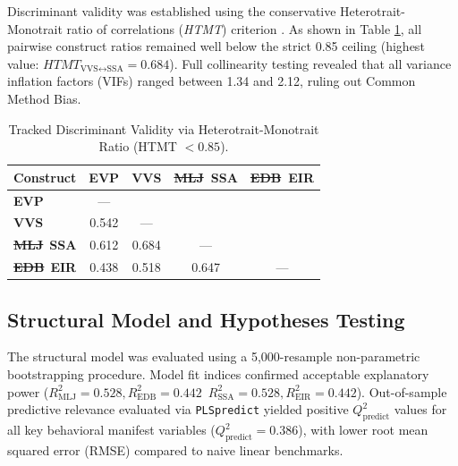 \documentclass[11pt,a4paper]{article}
\newcommand{\textadded}[1]{{\color{blue!80!black}\textbf{#1}}}
\newcommand{\textdeleted}[1]{{\color{red!70!black}\sout{#1}}}
\begin{document}
Discriminant validity was established using the conservative Heterotrait-Monotrait ratio of correlations (\textit{HTMT}) criterion \citep{cerulli2026dark}. As shown in Table \ref{tab:tracked_htmt_matrix}, all pairwise construct ratios remained well below the strict 0.85 ceiling (highest value: $HTMT_{\text{VVS} \leftrightarrow \text{SSA}} = 0.684$). Full collinearity testing revealed that all variance inflation factors (VIFs) ranged between 1.34 and 2.12, ruling out Common Method Bias.

\begin{table}[htbp]
\centering
\small
\begin{tabular}{lcccc}
\toprule
\textbf{Construct} & \textbf{EVP} & \textbf{VVS} & \textdeleted{\textbf{MLJ}}\ \textadded{\textbf{SSA}} & \textdeleted{\textbf{EDB}}\ \textadded{\textbf{EIR}} \\
\midrule
\textbf{EVP} & --- & & & \\
\textbf{VVS} & 0.542 & --- & & \\
\textdeleted{\textbf{MLJ}}\ \textadded{\textbf{SSA}} & 0.612 & 0.684 & --- & \\
\textdeleted{\textbf{EDB}}\ \textadded{\textbf{EIR}} & 0.438 & 0.518 & 0.647 & --- \\
\bottomrule
\end{tabular}
\caption{Tracked Discriminant Validity via Heterotrait-Monotrait Ratio (HTMT $< 0.85$).}
\label{tab:tracked_htmt_matrix}
\end{table}

\subsection{Structural Model and Hypotheses Testing}
The structural model was evaluated using a 5,000-resample non-parametric bootstrapping procedure. Model fit indices confirmed acceptable explanatory power (\textdeleted{$R^2_{\text{MLJ}} = 0.528, R^2_{\text{EDB}} = 0.442$}\ \textadded{$R^2_{\text{SSA}} = 0.528, R^2_{\text{EIR}} = 0.442$}). Out-of-sample predictive relevance evaluated via \texttt{PLSpredict} yielded positive $Q^2_{\text{predict}}$ values for all key behavioral manifest variables ($Q^2_{\text{predict}} = 0.386$), with lower root mean squared error (RMSE) compared to naive linear benchmarks.
\end{document}
